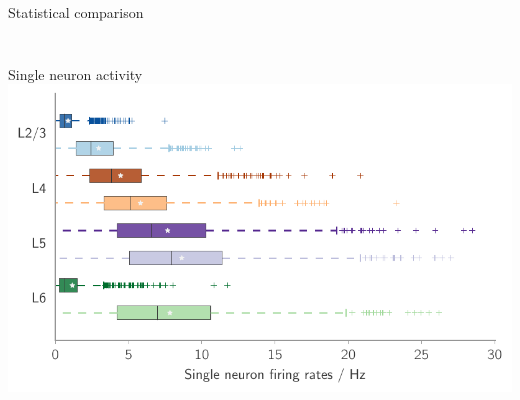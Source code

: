 \documentclass[xcolor=x11names,compress]{beamer}
\renewcommand{\(}{\begin{columns}}
\renewcommand{\)}{\end{columns}}
\newcommand{\<}[1]{\begin{column}{#1}}
\renewcommand{\>}{\end{column}}
\begin{document}
\begin{frame}[t]{Statistical comparison}
\begin{columns}[T]
\begin{column}[T]{3cm}
{        }
    \end{column}
    \begin{column}[T]{3cm} %
    \end{column}
    \end{columns}
\end{frame}

\begin{frame}[t]{Single neuron activity}
        \includegraphics[height=0.8\textheight]{../figures/single_neuron_activity_rates} 
\end{frame}
\end{document}
